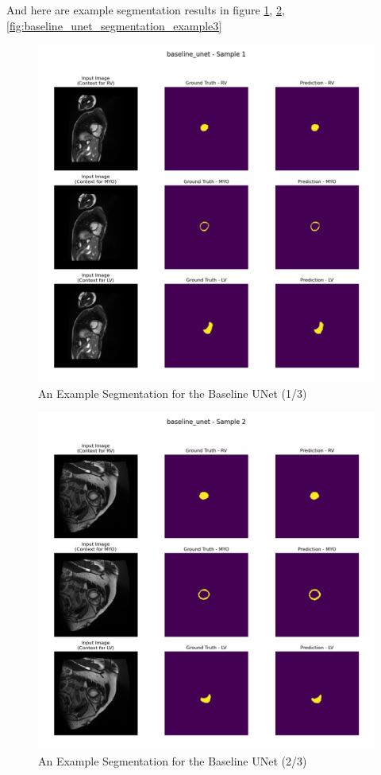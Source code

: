 \documentclass{article}
\begin{document}
And here are example segmentation results in figure \ref{fig:baseline_unet_segmentation_example1},
\ref{fig:baseline_unet_segmentation_example2}, \ref{fig:baseline_unet_segmentation_example3}
\begin{figure}[H]
  \centering
  \includegraphics[width=\linewidth]{../result/baseline_unet/sample_1_segmentation.png}
  \caption{An Example Segmentation for the Baseline UNet (1/3)}
  \label{fig:baseline_unet_segmentation_example1}
\end{figure}
\begin{figure}[H]
  \centering
  \includegraphics[width=\linewidth]{../result/baseline_unet/sample_2_segmentation.png}
  \caption{An Example Segmentation for the Baseline UNet (2/3)}
  \label{fig:baseline_unet_segmentation_example2}
\end{figure}
\end{document}
